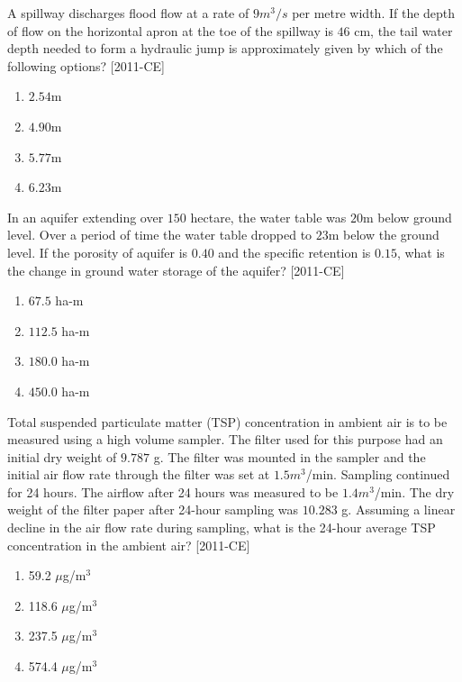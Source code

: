 \iffalse
\chapter{2011}
\author{AI24BTECH11028}
\section{ce}
\fi




    \item A spillway discharges flood flow at a rate of $9 m^3/s$ per metre width. If the depth of flow on the horizontal apron at the toe of the spillway is $46$ cm, the tail water depth needed to form a hydraulic jump is approximately given by which of the following options? \hfill{[2011-CE]}
    \begin{enumerate}
        \item $2.54$m
        \item $4.90$m
        \item $5.77$m
        \item $6.23$m
    \end{enumerate}

    \item In an aquifer extending over $150$ hectare, the water table was $20$m below ground level. Over a period of time the water table dropped to $23$m below the ground level. If the porosity of aquifer is $0.40$ and the specific retention is $0.15$, what is the change in ground water storage of the aquifer? \hfill{[2011-CE]}
    \begin{enumerate}
        \item $67.5$ ha-m
        \item $112.5$ ha-m
        \item $180.0$ ha-m
        \item $450.0$ ha-m
    \end{enumerate}

    \item Total suspended particulate matter (TSP) concentration in ambient air is to be measured using a high volume sampler. The filter used for this purpose had an initial dry weight of $9.787$ g. The filter was mounted in the sampler and the initial air flow rate through the filter was set at $1.5 m^3$/min. Sampling continued for 24 hours. The airflow after 24 hours was measured to be $1.4 m^3$/min. The dry weight of the filter paper after 24-hour sampling was $10.283$ g. Assuming a linear decline in the air flow rate during sampling, what is the 24-hour average TSP concentration in the ambient air? \hfill{[2011-CE]}
    \begin{enumerate}
        \item 59.2 $\mu$g/m$^3$
        \item 118.6 $\mu$g/m$^3$
        \item 237.5 $\mu$g/m$^3$
        \item 574.4 $\mu$g/m$^3$
    \end{enumerate}

